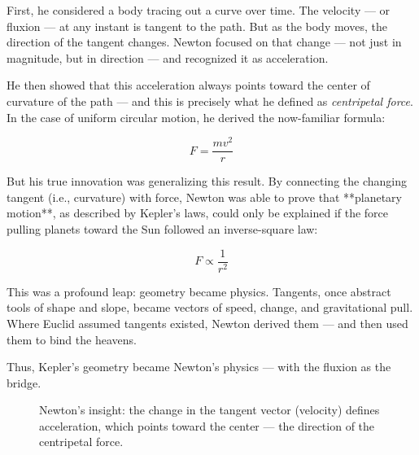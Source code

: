 First, he considered a body tracing out a curve over time. The velocity — or fluxion — at any instant is tangent to the path. But as the body moves, the direction of the tangent changes. Newton focused on that change — not just in magnitude, but in direction — and recognized it as acceleration.

He then showed that this acceleration always points toward the center of curvature of the path — and this is precisely what he defined as \textit{centripetal force}. In the case of uniform circular motion, he derived the now-familiar formula:

\[
F = \frac{mv^2}{r}
\]

But his true innovation was generalizing this result. By connecting the changing tangent (i.e., curvature) with force, Newton was able to prove that **planetary motion**, as described by Kepler’s laws, could only be explained if the force pulling planets toward the Sun followed an inverse-square law:

\[
F \propto \frac{1}{r^2}
\]

This was a profound leap: geometry became physics. Tangents, once abstract tools of shape and slope, became vectors of speed, change, and gravitational pull. Where Euclid assumed tangents existed, Newton derived them — and then used them to bind the heavens.

Thus, Kepler’s geometry became Newton’s physics — with the fluxion as the bridge.
\begin{figure}[H]
\centering
{}
\caption{Newton’s insight: the change in the tangent vector (velocity) defines acceleration, which points toward the center — the direction of the centripetal force.}
\end{figure}





